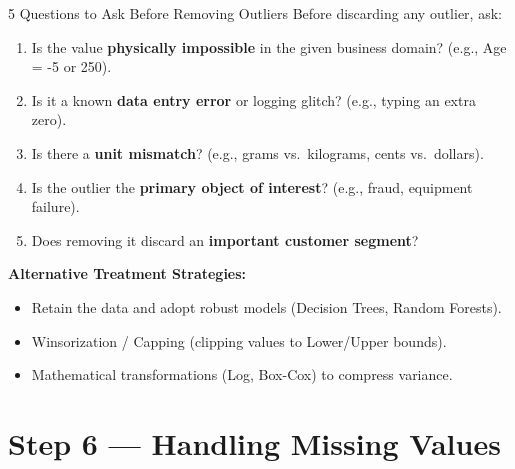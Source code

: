 \documentclass[aspectratio=169,11pt]{beamer}
\newcommand{\smallgap}{\vspace{0.35em}}
\begin{document}
\begin{frame}{5 Questions to Ask Before Removing Outliers}
Before discarding any outlier, ask:
\begin{enumerate}
  \item Is the value \textbf{physically impossible} in the given business domain? (e.g., Age = -5 or 250).
  \item Is it a known \textbf{data entry error} or logging glitch? (e.g., typing an extra zero).
  \item Is there a \textbf{unit mismatch}? (e.g., grams vs.\ kilograms, cents vs.\ dollars).
  \item Is the outlier the \textbf{primary object of interest}? (e.g., fraud, equipment failure).
  \item Does removing it discard an \textbf{important customer segment}?
\end{enumerate}

\smallgap
\textbf{Alternative Treatment Strategies:}
\begin{itemize}
  \item Retain the data and adopt robust models (Decision Trees, Random Forests).
  \item Winsorization / Capping (clipping values to Lower/Upper bounds).
  \item Mathematical transformations (Log, Box-Cox) to compress variance.
\end{itemize}
\end{frame}

\section{Step 6 — Handling Missing Values}
\end{document}
